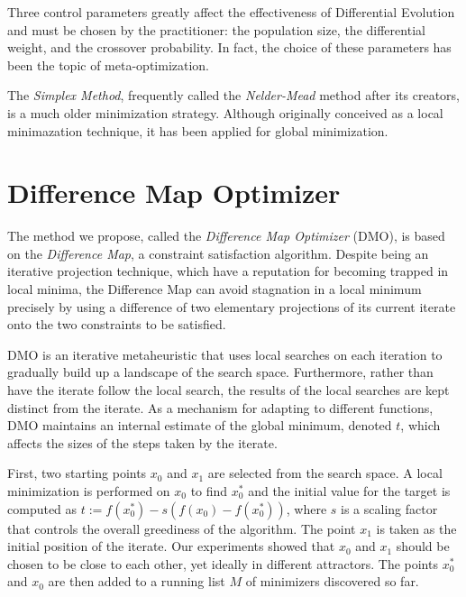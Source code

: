 \documentclass[12pt]{article}
\begin{document}
    Three control parameters greatly affect the effectiveness of Differential
    Evolution and must be chosen by the practitioner\cite{storn1997}: the
    population size, the differential weight, and the crossover probability.
    In fact, the choice of these parameters has been the topic of
    meta-optimization\cite{pedersen2010}.

    The \emph{Simplex Method}\cite{nelder1965}, frequently called the
    \emph{Nelder-Mead} method after its creators, is a much older minimization
    strategy. Although originally conceived as a local minimazation technique,
    it has been applied for global minimization.

\section{Difference Map Optimizer}

    The method we propose, called the \emph{Difference Map Optimizer} (DMO), is
    based on the \emph{Difference Map}, a constraint satisfaction algorithm.
    Despite being an iterative projection technique, which have a reputation
    for becoming trapped in local minima, the Difference Map can avoid
    stagnation in a local minimum precisely by using a difference of two
    elementary projections of its current iterate onto the two constraints to
    be satisfied.

    DMO is an iterative metaheuristic that uses local searches on each
    iteration to gradually build up a landscape of the search space.
    Furthermore, rather than have the iterate follow the local search, the
    results of the local searches are kept distinct from the iterate.
    As a mechanism for adapting to different functions, DMO maintains an
    internal estimate of the global minimum, denoted $t$, which affects the
    sizes of the steps taken by the iterate.

    First, two starting points $x_0$ and $x_1$ are selected from the search
    space.
    A local minimization is performed on $x_0$ to find $x_0^*$ and the
    initial value for the target is computed as
    $t := f(x_0^*) - s (f(x_0) - f(x_0^*))$,
    where $s$ is a scaling factor that controls the overall greediness of the
    algorithm.
    The point $x_1$ is taken as the initial position of the iterate. Our
    experiments showed that $x_0$ and $x_1$ should be chosen to be close to
    each other, yet ideally in different attractors.
    The points $x_0^*$ and $x_0$ are then added to a running list $M$ of
    minimizers discovered so far.
\end{document}

